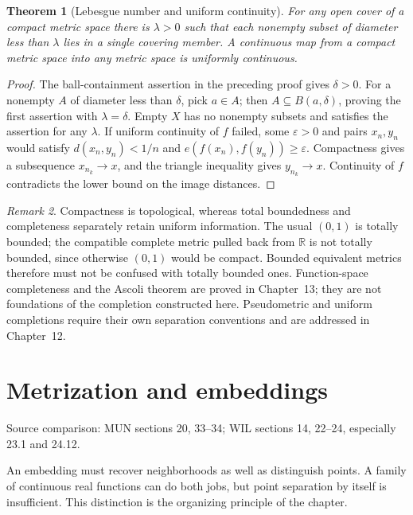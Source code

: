 \documentclass[11pt,oneside,openany]{book}
\newtheorem{theorem}{Theorem}[chapter]
\theoremstyle{definition}
\theoremstyle{remark}
\newtheorem{remark}[theorem]{Remark}
\newcounter{foundation}
\newcommand{\R}{\mathbb R}\newcommand{\C}{\mathbb C}
\newcommand{\eps}{\varepsilon}
\newcommand{\source}[1]{\par\begingroup\small\sffamily\color{black!65}Source comparison: #1\par\endgroup}
\begin{document}
\begin{theorem}[Lebesgue number and uniform continuity]\label{d10:09:lebesgue}
For any open cover of a compact metric space there is $\lambda>0$ such that each nonempty subset of diameter less than $\lambda$ lies in a single covering member. A continuous map from a compact metric space into any metric space is uniformly continuous.
\end{theorem}
\begin{proof}
The ball-containment assertion in the preceding proof gives $\delta>0$. For a nonempty $A$ of diameter less than $\delta$, pick $a\in A$; then $A\subseteq B(a,\delta)$, proving the first assertion with $\lambda=\delta$. Empty $X$ has no nonempty subsets and satisfies the assertion for any $\lambda$. If uniform continuity of $f$ failed, some $\eps>0$ and pairs $x_n,y_n$ would satisfy $d(x_n,y_n)<1/n$ and $e(f(x_n),f(y_n))\geq\eps$. Compactness gives a subsequence $x_{n_k}\to x$, and the triangle inequality gives $y_{n_k}\to x$. Continuity of $f$ contradicts the lower bound on the image distances.
\end{proof}

\begin{remark}\label{d10:09:metric-scope}
Compactness is topological, whereas total boundedness and completeness separately retain uniform information. The usual $(0,1)$ is totally bounded; the compatible complete metric pulled back from $\R$ is not totally bounded, since otherwise $(0,1)$ would be compact. Bounded equivalent metrics therefore must not be confused with totally bounded ones. Function-space completeness and the Ascoli theorem are proved in Chapter~13; they are not foundations of the completion constructed here. Pseudometric and uniform completions require their own separation conventions and are addressed in Chapter~12.
\end{remark}



\chapter{Metrization and embeddings}\label{ch:d10-10}
\source{MUN sections 20, 33--34; WIL sections 14, 22--24, especially 23.1 and 24.12.}

An embedding must recover neighborhoods as well as distinguish points. A family of continuous real functions can do both jobs, but point separation by itself is insufficient. This distinction is the organizing principle of the chapter.
\end{document}
